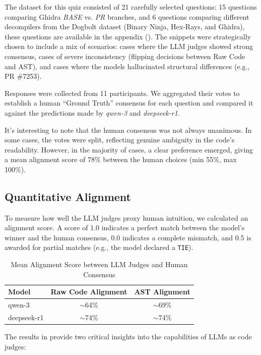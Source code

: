 The dataset for this quiz consisted of 21 carefully selected questions: 15 questions comparing Ghidra \emph{BASE} vs. \emph{PR} branches, and 6 questions comparing different decompilers from the Dogbolt dataset (Binary Ninja, Hex-Rays, and Ghidra), these questions are available in the appendix ().
The snippets were strategically chosen to include a mix of scenarios: cases where the \ac{LLM} judges showed strong consensus, cases of severe inconsistency (flipping decisions between Raw Code and \ac{AST}), and cases where the models hallucinated structural differences (e.g., PR \#7253).

Responses were collected from 11 participants. We aggregated their votes to establish a human ``Ground Truth'' consensus for each question and compared it against the predictions made by \emph{qwen-3} and \emph{deepseek-r1}.

It's interesting to note that the human consensus was not always unanimous. In some cases, the votes were split, reflecting genuine ambiguity in the code's readability. However, in the majority of cases, a clear preference emerged, giving a mean alignment score of 78\% between the human choices (min 55\%, max 100\%).

\subsection{Quantitative Alignment}

To measure how well the \ac{LLM} judges proxy human intuition, we calculated an alignment score. A score of 1.0 indicates a perfect match between the model's winner and the human consensus, 0.0 indicates a complete mismatch, and 0.5 is awarded for partial matches (e.g., the model declared a \texttt{TIE}). 

\begin{table}%
\centering
\caption{Mean Alignment Score between LLM Judges and Human Consensus}\label{tab:human_alignment}
\begin{tabular}{lcc}
\toprule
\textbf{Model} & \textbf{Raw Code Alignment} & \textbf{AST Alignment} \\
\midrule
qwen-3 & $\sim$64\% & $\sim$69\% \\
deepseek-r1 & $\sim$74\% & $\sim$74\% \\
\bottomrule
\end{tabular}
\end{table}

The results in  provide two critical insights into the capabilities of \ac{LLM}s as code judges:

